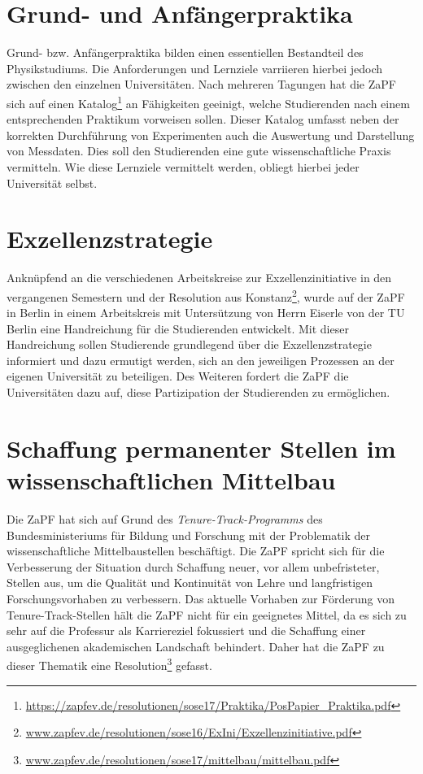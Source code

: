 \documentclass[a4paper]{article}
\begin{document}
\section*{Grund- und Anfängerpraktika}
Grund- bzw. Anfängerpraktika bilden einen essentiellen Bestandteil des
Physikstudiums. Die Anforderungen und Lernziele varriieren hierbei jedoch
zwischen den einzelnen Universitäten. Nach mehreren Tagungen hat die ZaPF sich
auf einen
Katalog\footnote{\href{https://zapfev.de/resolutionen/sose17/Praktika/PosPapier_Praktika.pdf}{\url{https://zapfev.de/resolutionen/sose17/Praktika/PosPapier_Praktika.pdf}}}
an Fähigkeiten geeinigt, welche Studierenden nach einem entsprechenden
Praktikum vorweisen sollen. Dieser Katalog umfasst neben der korrekten
Durchführung von Experimenten auch die Auswertung und Darstellung von
Messdaten. Dies soll den Studierenden eine gute wissenschaftliche Praxis
vermitteln.  Wie diese Lernziele vermittelt werden, obliegt hierbei jeder
Universität selbst.

\section*{Exzellenzstrategie}
Anknüpfend an die verschiedenen Arbeitskreise zur Exzellenzinitiative in den
vergangenen Semestern  und der Resolution aus
Konstanz\footnote{\href{https://zapfev.de/resolutionen/sose16/ExIni/Exzellenzinitiative.pdf}{\url{www.zapfev.de/resolutionen/sose16/ExIni/Exzellenzinitiative.pdf}}},
wurde auf der ZaPF in Berlin in einem Arbeitskreis mit Untersützung von Herrn
Eiserle von der TU Berlin eine Handreichung für die Studierenden entwickelt.
Mit dieser Handreichung sollen Studierende grundlegend über die
Exzellenzstrategie informiert und dazu ermutigt werden, sich an den jeweiligen
Prozessen an der eigenen Universität zu beteiligen. Des Weiteren fordert die
ZaPF die Universitäten dazu auf, diese Partizipation der Studierenden zu
ermöglichen. 

\section*{Schaffung permanenter Stellen im wissenschaftlichen Mittelbau}
Die ZaPF hat sich auf Grund des \emph{Tenure-Track-Programms} des
Bundesministeriums für Bildung und Forschung mit der Problematik der
wissenschaftliche Mittelbaustellen beschäftigt. Die ZaPF spricht sich für die
Verbesserung der Situation durch Schaffung neuer, vor allem unbefristeter,
Stellen aus, um die Qualität und Kontinuität von Lehre und langfristigen
Forschungsvorhaben zu verbessern. Das aktuelle Vorhaben zur Förderung von
Tenure-Track-Stellen hält die ZaPF nicht für ein geeignetes Mittel, da es sich
zu sehr auf die Professur als Karriereziel fokussiert und die Schaffung einer
ausgeglichenen akademischen Landschaft behindert. Daher hat die ZaPF zu dieser
Thematik eine
Resolution\footnote{\href{https://zapfev.de/resolutionen/sose17/mittelbau/mittelbau.pdf}{\url{www.zapfev.de/resolutionen/sose17/mittelbau/mittelbau.pdf}}}
gefasst.
\end{document}
